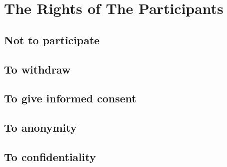 \section{The Rights of The Participants}
\subsection{Not to participate}
\subsection{To withdraw}
\subsection{To give informed consent}
\subsection{To anonymity}
\subsection{To confidentiality}